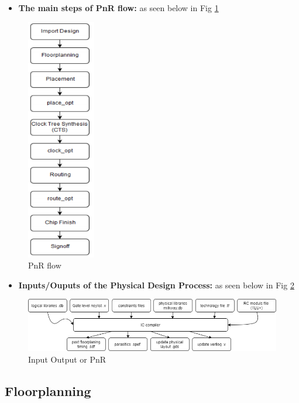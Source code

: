 \documentclass[../main.tex]{subfiles}
\begin{document}
\begin{itemize}
\item \textbf{The main steps of PnR flow:} as seen below in Fig \ref{fig:PnR_flow}
\end{itemize}
\begin{figure}[h]
\centering
\includegraphics[width=3cm]{diagrams/PnR_flow.PNG}
\caption{ PnR flow}
\label{fig:PnR_flow}
\end{figure}

\begin{itemize}
\item \textbf{Inputs/Ouputs of the Physical Design Process:} as seen below in Fig \ref{fig:IO_IC}
\end{itemize}
\begin{figure}[h]
\centering
\includegraphics[width=18cm]{diagrams/IO_IC.png}
\caption{ Input Output or PnR}
\label{fig:IO_IC}
\end{figure}

    \subsection{Floorplanning} 
    
\end{document}
